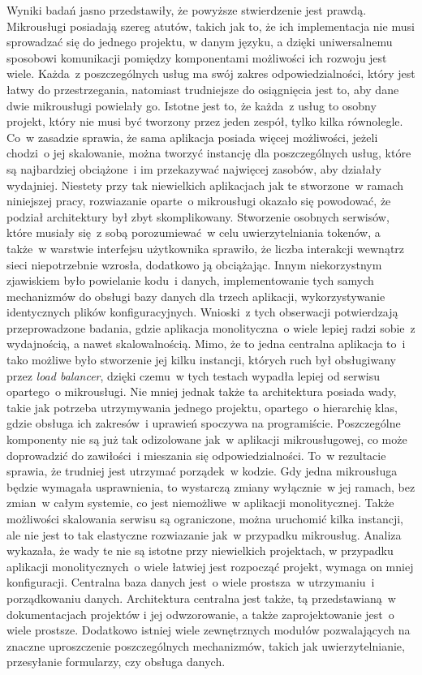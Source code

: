 Wyniki badań jasno przedstawiły, że powyższe stwierdzenie jest prawdą. Mikrousługi posiadają szereg atutów, takich jak to, że ich implementacja nie musi sprowadzać się do jednego projektu, w danym języku, a dzięki uniwersalnemu sposobowi komunikacji pomiędzy komponentami możliwości ich rozwoju jest wiele. Każda~z poszczególnych usług ma swój zakres odpowiedzialności, który jest łatwy do przestrzegania, natomiast trudniejsze do osiągnięcia jest to, aby dane dwie mikrousługi powielały go. Istotne jest to, że każda~z usług to osobny projekt, który nie musi być tworzony przez jeden zespół, tylko kilka równolegle. Co~w zasadzie sprawia, że sama aplikacja posiada więcej możliwości, jeżeli chodzi~o jej skalowanie, można tworzyć instancję dla poszczególnych usług, które są najbardziej obciążone~i im przekazywać najwięcej zasobów, aby działały wydajniej. Niestety przy tak niewielkich aplikacjach jak te stworzone~w ramach niniejszej pracy, rozwiazanie oparte~o mikrousługi okazało się powodować, że podział architektury był zbyt skomplikowany. Stworzenie osobnych serwisów, które musiały się~z sobą porozumiewać~w celu uwierzytelniania tokenów, a także~w warstwie interfejsu użytkownika sprawiło, że liczba interakcji wewnątrz sieci niepotrzebnie wzrosła, dodatkowo ją obciążając. Innym niekorzystnym zjawiskiem było powielanie kodu~i danych, implementowanie tych samych mechanizmów do obsługi bazy danych dla trzech aplikacji, wykorzystywanie identycznych plików konfiguracyjnych. Wnioski~z tych obserwacji potwierdzają przeprowadzone badania, gdzie aplikacja monolityczna~o wiele lepiej radzi sobie~z wydajnością, a nawet skalowalnością. Mimo, że to jedna centralna aplikacja to~i tako możliwe było stworzenie jej kilku instancji, których ruch był obsługiwany przez \textit{load balancer}, dzięki czemu~w tych testach wypadła lepiej od serwisu opartego~o mikrousługi. Nie mniej jednak także ta architektura posiada wady, takie jak potrzeba utrzymywania jednego projektu, opartego~o hierarchię klas, gdzie obsługa ich zakresów~i uprawień spoczywa na programiście. Poszczególne komponenty nie są już tak odizolowane jak~w aplikacji mikrousługowej, co może doprowadzić do zawiłości~i mieszania się odpowiedzialności. To~w rezultacie sprawia, że trudniej jest utrzymać porządek~w kodzie. Gdy jedna mikrousługa będzie wymagała usprawnienia, to wystarczą zmiany wyłącznie~w jej ramach, bez zmian~w całym systemie, co jest niemożliwe~w aplikacji monolitycznej. Także możliwości skalowania serwisu są ograniczone, można uruchomić kilka instancji, ale nie jest to tak elastyczne rozwiazanie jak~w przypadku mikrousług. Analiza wykazała, że wady te nie są istotne przy niewielkich projektach, w przypadku aplikacji monolitycznych~o wiele łatwiej jest rozpocząć projekt, wymaga on mniej konfiguracji. Centralna baza danych jest~o wiele prostsza~w utrzymaniu~i porządkowaniu danych. Architektura centralna jest także, tą przedstawianą~w dokumentacjach projektów\cite{flask} i jej odwzorowanie, a także zaprojektowanie jest~o wiele prostsze. Dodatkowo istniej wiele zewnętrznych modułów pozwalających na znaczne uproszczenie poszczególnych mechanizmów, takich jak uwierzytelnianie, przesyłanie formularzy, czy obsługa danych. 

